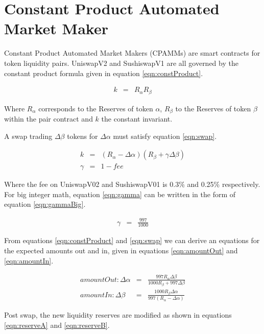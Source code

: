 \documentclass[runningheads]{llncs}
\begin{document}

\section{Constant Product Automated Market Maker}
Constant Product Automated Market Makers (CPAMMs) are smart contracts for token liquidity pairs. UniswapV2 and SushiswapV1 are all governed by the constant product formula given in equation \ref{eqn:constProduct}.

\begin{eqnarray}
	k  &=& R_{\alpha}  R_{\beta}  \label{eqn:constProduct}
\end{eqnarray}

Where \(R_{\alpha}\) corresponds to the Reserves of token \(\alpha\), \(R_{\beta}\) to the Reserves of token \(\beta\) within the pair contract and \( k \) the constant invariant.

A swap trading \( \Delta\beta\) tokens for \( \Delta\alpha \) must satisfy equation \ref{eqn:swap}.

\begin{eqnarray}
	k  &=& (R_{\alpha} - \Delta\alpha)  (R_{\beta} + \gamma\Delta\beta ) \label{eqn:swap}\\
	\gamma  &=& 1 - fee \label{eqn:gamma}
\end{eqnarray}

Where the fee on UniswapV02 and SushiswapV01 is 0.3\% and 0.25\% respectively. For big integer math, equation \ref{eqn:gamma} can be written in the form of equation \ref{eqn:gammaBig}.

\begin{eqnarray}
	\gamma  &=& \frac{997}{1000} \label{eqn:gammaBig}
\end{eqnarray}

From equations \ref{eqn:constProduct} and \ref{eqn:swap} we can derive an equations for the expected amounts out and in, given in equations \ref{eqn:amountOut} and \ref{eqn:amountIn}.

\begin{eqnarray}
	amountOut: \Delta\alpha  &=& \frac{997 R_{\alpha} \Delta\beta }{1000 R_{\beta} + 997 \Delta\beta} \label{eqn:amountOut}\\
	amountIn: \Delta\beta  &=& \frac{1000 R_{\beta} \Delta\alpha }{997 (R_{\alpha} - \Delta\alpha)} \label{eqn:amountIn}
\end{eqnarray}

Post swap, the new liquidity reserves are modified as shown in equations \ref{eqn:reserveA} and \ref{eqn:reserveB}.
\end{document}
